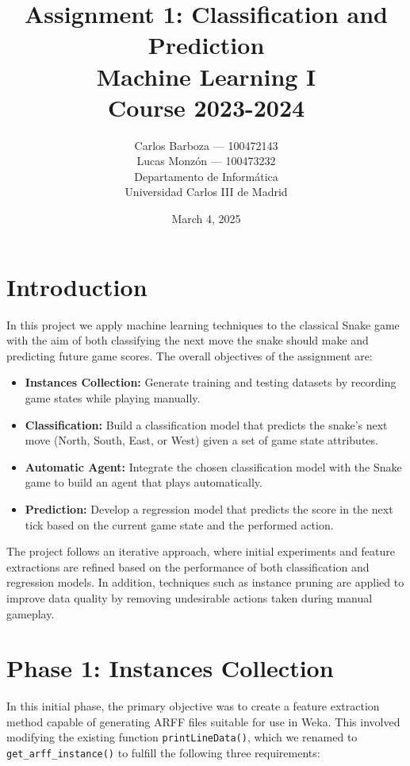 \documentclass[12pt,a4paper]{article}
\title{Assignment 1: Classification and Prediction\\[1ex]
Machine Learning I\\
Course 2023-2024}
\author{Carlos Barboza --- 100472143\\
Lucas Monzón --- 100473232\\[2ex]
Departamento de Informática\\
Universidad Carlos III de Madrid}
\date{March 4, 2025}
\begin{document}
\maketitle
\thispagestyle{empty}
\newpage




\section*{Introduction}
In this project we apply machine learning techniques to the classical Snake game with the aim of both classifying the next move the snake should make and predicting future game scores. The overall objectives of the assignment are:
\begin{itemize}
    \item \textbf{Instances Collection:} Generate training and testing datasets by recording game states while playing manually.
    \item \textbf{Classification:} Build a classification model that predicts the snake's next move (North, South, East, or West) given a set of game state attributes.
    \item \textbf{Automatic Agent:} Integrate the chosen classification model with the Snake game to build an agent that plays automatically.
    \item \textbf{Prediction:} Develop a regression model that predicts the score in the next tick based on the current game state and the performed action.
\end{itemize}

The project follows an iterative approach, where initial experiments and feature extractions are refined based on the performance of both classification and regression models. In addition, techniques such as instance pruning are applied to improve data quality by removing undesirable actions taken during manual gameplay.

\newpage


\section{Phase 1: Instances Collection}

In this initial phase, the primary objective was to create a feature extraction method capable of generating ARFF files suitable for use in Weka. 
This involved modifying the existing function \texttt{printLineData()}, which we renamed to \texttt{get\_arff\_instance()} to fulfill the following three requirements:
\end{document}
